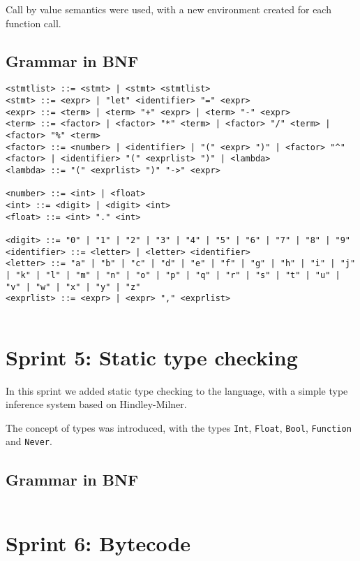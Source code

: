 \documentclass[a4paper, oneside, 11pt]{report}
\begin{document}
Call by value semantics were used, with a new environment created for each function call.

\subsection{Grammar in BNF}\label{subsec:grammar-in-bnf4}

\begin{verbatim}
<stmtlist> ::= <stmt> | <stmt> <stmtlist>
<stmt> ::= <expr> | "let" <identifier> "=" <expr>
<expr> ::= <term> | <term> "+" <expr> | <term> "-" <expr>
<term> ::= <factor> | <factor> "*" <term> | <factor> "/" <term> | <factor> "%" <term>
<factor> ::= <number> | <identifier> | "(" <expr> ")" | <factor> "^" <factor> | <identifier> "(" <exprlist> ")" | <lambda>
<lambda> ::= "(" <exprlist> ")" "->" <expr> 

<number> ::= <int> | <float>
<int> ::= <digit> | <digit> <int>
<float> ::= <int> "." <int>

<digit> ::= "0" | "1" | "2" | "3" | "4" | "5" | "6" | "7" | "8" | "9"
<identifier> ::= <letter> | <letter> <identifier>
<letter> ::= "a" | "b" | "c" | "d" | "e" | "f" | "g" | "h" | "i" | "j" | "k" | "l" | "m" | "n" | "o" | "p" | "q" | "r" | "s" | "t" | "u" | "v" | "w" | "x" | "y" | "z"
<exprlist> ::= <expr> | <expr> "," <exprlist>
	
\end{verbatim}

\section{Sprint 5: Static type checking}\label{sec:static-type-checking}

In this sprint we added static type checking to the language, with a simple type inference system based on 
Hindley-Milner.

The concept of types was introduced, with the types \texttt{Int}, \texttt{Float}, \texttt{Bool}, \texttt{Function} and
\texttt{Never}.

\subsection{Grammar in BNF}\label{subsec:grammar-in-bnf5}

\begin{verbatim}
\end{verbatim}

\section{Sprint 6: Bytecode}\label{sec:bytecode}
\end{document}
